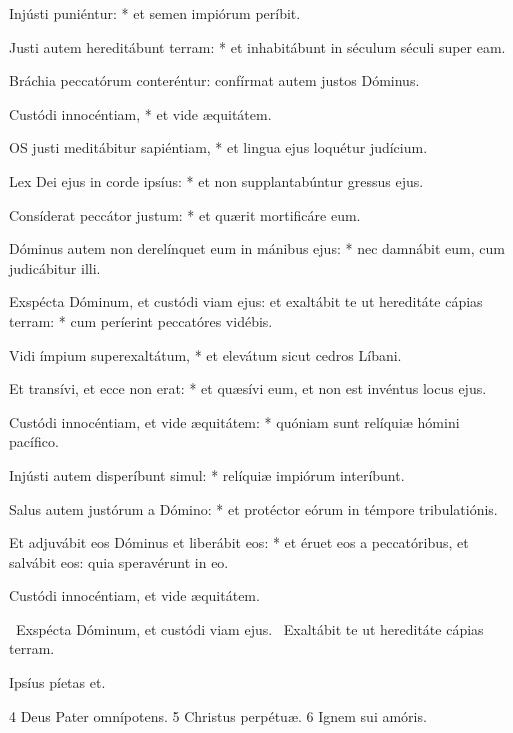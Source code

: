 Injústi puniéntur: * et semen impiórum períbit.

Justi autem hereditábunt terram: * et inhabitábunt in séculum séculi super eam.

 Bráchia peccatórum conteréntur: confírmat autem justos Dóminus.

 Custódi innocéntiam, * et vide æquitátem.


\lettrine[lines=2]{O}{S} justi meditábitur sapiéntiam, * et lingua ejus loquétur judícium.

Lex Dei ejus in corde ipsíus: * et non supplantabúntur gressus ejus.

Consíderat peccátor justum: * et quærit mortificáre eum.

Dóminus autem non derelínquet eum in mánibus ejus: * nec damnábit eum, cum judicábitur illi.

Exspécta Dóminum, et custódi viam ejus: et exaltábit te ut hereditáte cápias terram: * cum períerint peccatóres vidébis.

Vidi ímpium superexaltátum, * et elevátum sicut cedros Líbani.

Et transívi, et ecce non erat: * et quæsívi eum, et non est invéntus locus ejus.

Custódi innocéntiam, et vide æquitátem: * quóniam sunt relíquiæ hómini pacífico.

Injústi autem disperíbunt simul: * relíquiæ impiórum interíbunt.

Salus autem justórum a Dómino: * et protéctor eórum in témpore tribulatiónis.

Et adjuvábit eos Dóminus et liberábit eos: * et éruet eos a peccatóribus, et salvábit eos: quia speravérunt in eo.

 Custódi innocéntiam, et vide æquitátem.


\V\ Exspécta Dóminum, et custódi viam ejus. \R\ Exaltábit te ut hereditáte cápias terram.

 Ipsíus píetas et.

 4 Deus Pater omnípotens. 5 Christus perpétuæ. 6 Ignem sui amóris.


